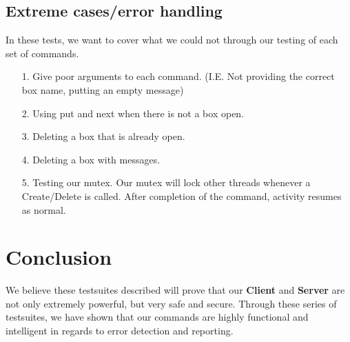 \documentclass{article}
\begin{document}
        \subsection{Extreme cases/error handling}
        In these tests, we want to cover what we could not through our testing of each set of commands.
            \begin{itemize}
                \item[1.] Give poor arguments to each command. (I.E. Not providing the correct box name, putting an empty message)
                \item[2.] Using put and next when there is not a box open.
                \item[3.] Deleting a box that is already open.
                \item[4.] Deleting a box with messages.    
                \item[5.] Testing our mutex. Our mutex will lock other threads whenever a Create/Delete is called. After completion of the command, activity resumes as normal.
            \end{itemize}
    \section{Conclusion}
        We believe these testsuites described will prove that our \textbf{Client} and \textbf{Server} are not only extremely powerful, but very safe and secure. Through these series of testsuites, we have shown that our commands are highly functional and intelligent in regards to error detection and reporting.
\end{document}
